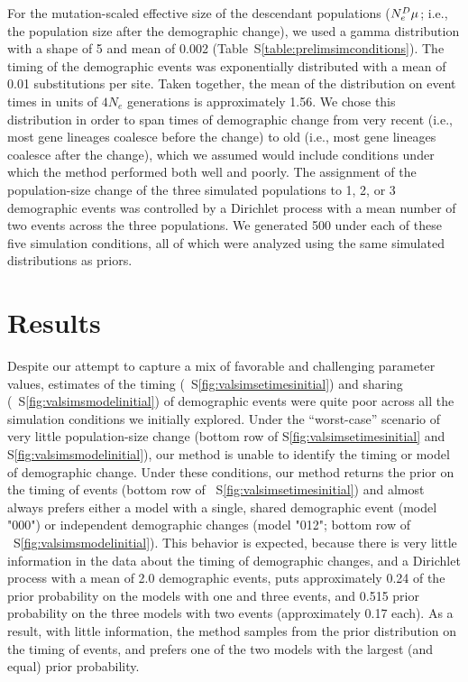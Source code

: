 For the mutation-scaled effective size of the descendant populations
($\epopsize[\descendantpopindex{}]\murate$; i.e., the population size after the
demographic change),
we used a gamma distribution with a shape of 5 and mean of 0.002
(Table~S\ref{table:prelimsimconditions}).
The timing of the demographic events was exponentially distributed with a mean
of 0.01 substitutions per site.
Taken together, the mean of the distribution on event times in units of $4N_e$
generations is approximately 1.56.
We chose this distribution in order to span times of demographic change from
very recent (i.e., most gene lineages coalesce before the change) to old (i.e.,
most gene lineages coalesce after the change),
which we assumed would include conditions under which the method performed both
well and poorly.
The assignment of the population-size change of the three simulated populations
to 1, 2, or 3 demographic events was controlled by a Dirichlet process with a
mean number of two events across the three populations.
We generated 500 \datasets under each of these five simulation conditions, all
of which were analyzed using the same simulated distributions as priors.

\section{Results}
Despite our attempt to capture a mix of favorable and challenging parameter
values,
estimates of the timing
(\fig{}~S\ref{fig:valsimsetimesinitial})
and sharing
(\fig{}~S\ref{fig:valsimsmodelinitial})
of demographic events were quite poor across all the simulation conditions
we initially explored.
Under the ``worst-case'' scenario of very little population-size change
(bottom row of \figs S\ref{fig:valsimsetimesinitial} and
S\ref{fig:valsimsmodelinitial}),
our method is unable to identify the timing or model of demographic change.
Under these conditions, our method returns the prior on the timing of events
(bottom row of \fig{}~S\ref{fig:valsimsetimesinitial})
and almost always prefers either a model with a single, shared demographic
event (model "000") or independent demographic changes (model "012";
bottom row of \fig{}~S\ref{fig:valsimsmodelinitial}).
This behavior is expected, because there is very little information in the
data about the timing of demographic changes, and a Dirichlet process with a
mean of 2.0 demographic events, puts approximately 0.24 of the prior
probability on the models with one and three events, and 0.515 prior
probability on the three models with two events (approximately 0.17 each).
As a result, with little information, the method samples from the prior
distribution on the timing of events, and prefers one of the two models with
the largest (and equal) prior probability.

